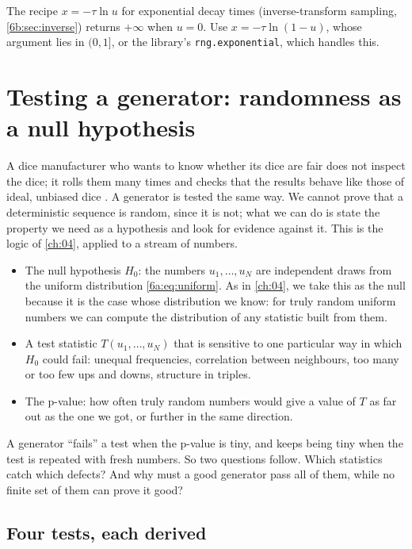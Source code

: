 \begin{pitfall}[$\ln u$ with $u=0$]
The recipe $x=-\tau\ln u$ for exponential decay times (inverse-transform sampling, \cref{6b:sec:inverse})
returns $+\infty$ when $u=0$. Use $x=-\tau\ln(1-u)$, whose argument lies in
$(0,1]$, or the library's \texttt{rng.exponential}, which handles this.
\end{pitfall}
\section{Testing a generator: randomness as a null hypothesis}
\label{6a:sec:tests}

A dice manufacturer who wants to know whether its dice are fair does not inspect
the dice; it rolls them many times and checks that the results behave like those of
ideal, unbiased dice . A generator is tested the same way.
We cannot prove that a deterministic sequence is random, since it is not; what we
can do is state the property we need as a hypothesis and look for evidence against
it. This is the logic of \cref{ch:04}, applied to a stream of numbers.
\begin{itemize}[itemsep=1pt]
  \item The null hypothesis $H_0$: the numbers $u_1,\dots,u_N$ are independent
        draws from the uniform distribution \eqref{6a:eq:uniform}. As in
        \cref{ch:04}, we take this as the null because it is the case whose
        distribution we know: for truly random uniform numbers we can compute
        the distribution of any statistic built from them.
  \item A test statistic $T(u_1,\dots,u_N)$ that is sensitive to one particular way
        in which $H_0$ could fail: unequal frequencies, correlation between
        neighbours, too many or too few ups and downs, structure in triples.
  \item The p-value: how often truly random numbers would give a value of $T$
        as far out as the one we got, or further in the same direction.
\end{itemize}
A generator ``fails'' a test when the p-value is tiny, and keeps being tiny when
the test is repeated with fresh numbers. So two questions follow. Which
statistics catch which defects? And why must a good generator pass all of them,
while no finite set of them can prove it good?

\subsection{Four tests, each derived}

